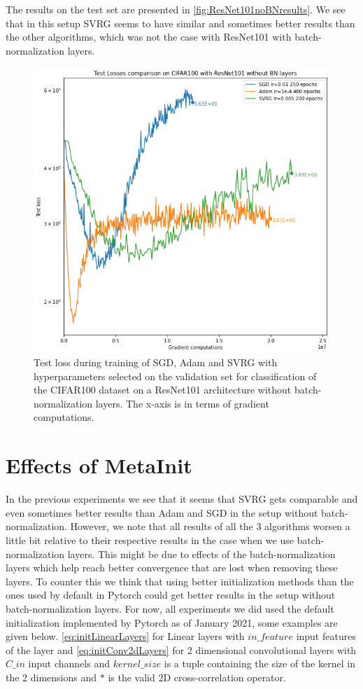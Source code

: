 \documentclass[a4paper,11pt,oneside]{report}
\begin{document}
The results on the test set are presented in \autoref{fig:ResNet101noBNresults}. We see that in this setup SVRG seems to have similar and sometimes better results than the other algorithms, which was not the case with ResNet101 with batch-normalization layers. 

\begin{figure}
    \centering
    \includegraphics[width=\columnwidth]{figures/ResNet101noBNResults.png}
    \caption{Test loss during training of SGD, Adam and SVRG with hyperparameters selected on the validation set for classification of the CIFAR100 dataset on a ResNet101 architecture without batch-normalization layers. The x-axis is in terms of gradient computations.}
    \label{fig:ResNet101noBNresults}
\end{figure}

\section{Effects of MetaInit}
In the previous experiments we see that it seems that SVRG gets comparable and even sometimes better results than Adam and SGD in the setup without batch-normalization. However, we note that all results of all the 3 algorithms worsen a little bit relative to their respective results in the case when we use batch-normalization layers. This might be due to effects of the batch-normalization layers which help reach better convergence that are lost when removing these layers. To counter this we think that using better initialization methods than the ones used by default in Pytorch could get better results in the setup without batch-normalization layers. For now, all experiments we did used the default initialization implemented by Pytorch as of January 2021, some examples are given below. \autoref{eq:initLinearLayers} for Linear layers with $in\_feature$ input features of the layer and \autoref{eq:initConv2dLayers} for 2 dimensional convolutional layers with $C\_in$ input channels and $kernel\_size$ is a tuple containing the size of the kernel in the 2 dimensions and $*$ is the valid 2D cross-correlation operator. 
\end{document}
